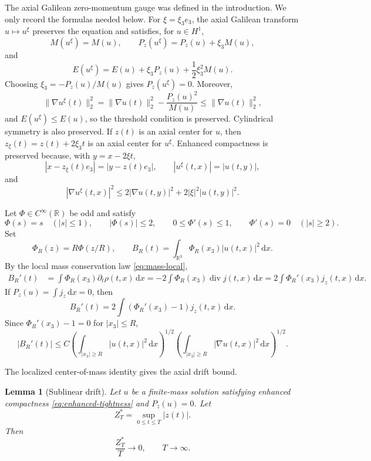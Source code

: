 \documentclass[preprint,12pt]{elsarticle}
\numberwithin{equation}{section}
\newcommand{\R}{\mathbb R}
\newcommand{\dd}{\,\mathrm d}
\newcommand{\na}{\nabla}
\newcommand{\pa}{\partial}
\newcommand{\ez}{e_3}
\newtheorem{lemma}[theorem]{Lemma}
\theoremstyle{remark}
\begin{document}
The axial Galilean zero-momentum gauge was defined in the introduction.  We only record the formulas needed below.  For $\xi=\xi_3\ez$, the axial Galilean transform $u\mapsto u^\xi$ preserves the equation and satisfies, for $u\in H^1$,
\[
  M(u^\xi)=M(u),
  \qquad P_z(u^\xi)=P_z(u)+\xi_3M(u),
\]
and
\[
  E(u^\xi)=E(u)+\xi_3P_z(u)+\frac12\xi_3^2M(u).
\]
Choosing $\xi_3=-P_z(u)/M(u)$ gives $P_z(u^\xi)=0$.  Moreover,
\[
  \|\na u^\xi(t)\|_2^2
  =\|\na u(t)\|_2^2-\frac{P_z(u)^2}{M(u)}
  \le\|\na u(t)\|_2^2,
\]
and $E(u^\xi)\le E(u)$, so the threshold condition is preserved.  Cylindrical symmetry is also preserved.  If $z(t)$ is an axial center for $u$, then $z_\xi(t)=z(t)+2\xi_3t$ is an axial center for $u^\xi$.  Enhanced compactness is preserved because, with $y=x-2\xi t$,
\[
  |x-z_\xi(t)\ez|=|y-z(t)\ez|,
  \qquad |u^\xi(t,x)|=|u(t,y)|,
\]
and
\[
  |\na u^\xi(t,x)|^2
  \le2|\na u(t,y)|^2+2|\xi|^2|u(t,y)|^2.
\]

Let $\Phi\in C^\infty(\R)$ be odd and satisfy
\[
  \Phi(s)=s\quad(|s|\le1),
  \qquad |\Phi(s)|\le2,
  \qquad 0\le\Phi'(s)\le1,
  \qquad \Phi'(s)=0\quad(|s|\ge2).
\]
Set
\[
  \Phi_R(z)=R\Phi(z/R),
  \qquad B_R(t)=\int_{\R^3}\Phi_R(x_3)|u(t,x)|^2\dd x.
\]
By the local mass conservation law \eqref{eq:mass-local},
\begin{align*}
  B_R'(t)
  &=\int \Phi_R(x_3)\pa_t\rho(t,x)\dd x
  =-2\int \Phi_R(x_3)\operatorname{div}j(t,x)\dd x
  =2\int \Phi_R'(x_3)j_z(t,x)\dd x.
\end{align*}
If $P_z(u)=\int j_z\dd x=0$, then
\[
  B_R'(t)=2\int (\Phi_R'(x_3)-1)j_z(t,x)\dd x.
\]
Since $\Phi_R'(x_3)-1=0$ for $|x_3|\le R$,
\begin{equation}\label{eq:BR-prime-tail}
  |B_R'(t)|\le C
  \left(\int_{|x_3|\ge R}|u(t,x)|^2\dd x\right)^{1/2}
  \left(\int_{|x_3|\ge R}|\na u(t,x)|^2\dd x\right)^{1/2}.
\end{equation}

The localized center-of-mass identity gives the axial drift bound.

\begin{lemma}[Sublinear drift]\label{lem:sublinear-drift}
Let $u$ be a finite-mass solution satisfying enhanced compactness \eqref{eq:enhanced-tightness} and $P_z(u)=0$.  Let
\[
  Z_T^*=\sup_{0\le t\le T}|z(t)|.
\]
Then
\begin{equation}\label{eq:sublinear-drift}
  \frac{Z_T^*}{T}\to0,
  \qquad T\to\infty.
\end{equation}
\end{lemma}
\end{document}
